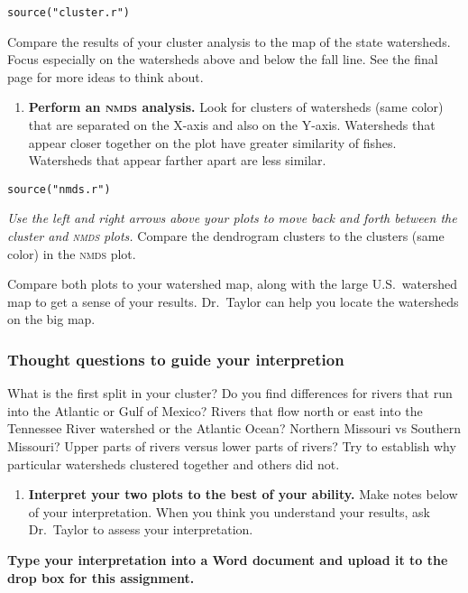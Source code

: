 \documentclass[11pt]{article}
\begin{document}
\begin{verbatim}
source("cluster.r")
\end{verbatim}

Compare the results of your cluster analysis to the map of the state watersheds. Focus especially on the watersheds above and below the fall line. See the final page for more ideas to think about.


\begin{enumerate}[resume]
\item \textbf{Perform an \textsc{nmds} analysis.} Look for clusters of watersheds (same color) that are separated on the X-axis and also on the Y-axis. Watersheds that appear closer together on the plot have greater similarity of fishes. Watersheds that appear farther apart are less similar.

\end{enumerate}

\begin{verbatim}
source("nmds.r")
\end{verbatim}

\textit{Use the left and right arrows above your plots to move back and forth between the cluster and \textsc{nmds} plots.} Compare the dendrogram clusters to the clusters (same color) in the \textsc{nmds} plot.

Compare both plots to your watershed map, along with the large U.S.~watershed map to 
get a sense of your results. Dr.~Taylor can help you locate the watersheds on the big map.%

\subsubsection*{Thought questions to guide your interpretion}

What is the first split in your cluster? Do you find differences for rivers that run into the Atlantic or Gulf of Mexico? Rivers that flow north or east into the Tennessee River watershed or the Atlantic Ocean? Northern Missouri vs Southern Missouri?  Upper parts of rivers versus lower parts of rivers? Try to establish why particular watersheds clustered together and others did not.


\begin{enumerate}[resume]
\item \textbf{Interpret your two plots to the best of your ability.} Make notes below of your interpretation. When you think you understand your results, ask Dr.~Taylor to assess your interpretation.
\end{enumerate}



\textbf{Type your interpretation into a Word document and upload it to the drop box for this assignment.}
\end{document}
